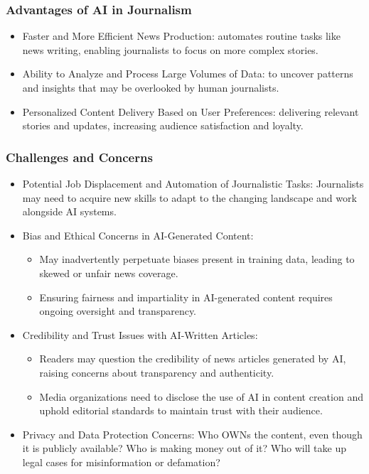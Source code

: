 \begin{frame}[fragile]\frametitle{Advantages of AI in Journalism}

\begin{itemize}
\item Faster and More Efficient News Production: automates routine tasks like news writing, enabling journalists to focus on more complex stories.
\item Ability to Analyze and Process Large Volumes of Data: to uncover patterns and insights that may be overlooked by human journalists.
\item Personalized Content Delivery Based on User Preferences: delivering relevant stories and updates, increasing audience satisfaction and loyalty.
\end{itemize}

\end{frame}

\begin{frame}[fragile]\frametitle{Challenges and Concerns}

\begin{itemize}
\item Potential Job Displacement and Automation of Journalistic Tasks: Journalists may need to acquire new skills to adapt to the changing landscape and work alongside AI systems.
\item Bias and Ethical Concerns in AI-Generated Content:
    \begin{itemize}
        \item May inadvertently perpetuate biases present in training data, leading to skewed or unfair news coverage.
        \item Ensuring fairness and impartiality in AI-generated content requires ongoing oversight and transparency.
    \end{itemize}
\item Credibility and Trust Issues with AI-Written Articles:
    \begin{itemize}
        \item Readers may question the credibility of news articles generated by AI, raising concerns about transparency and authenticity.
        \item Media organizations need to disclose the use of AI in content creation and uphold editorial standards to maintain trust with their audience.
    \end{itemize}
\item Privacy and Data Protection Concerns: Who OWNs the content, even though it is publicly available? Who is making money out of it? Who will take up legal cases for misinformation or defamation?
\end{itemize}

\end{frame}

